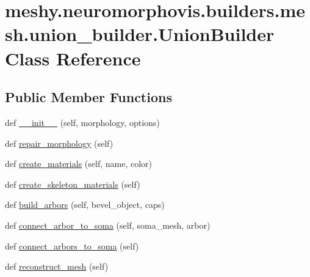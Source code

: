 \hypertarget{classmeshy_1_1neuromorphovis_1_1builders_1_1mesh_1_1union__builder_1_1UnionBuilder}{}\section{meshy.\+neuromorphovis.\+builders.\+mesh.\+union\+\_\+builder.\+Union\+Builder Class Reference}
\label{classmeshy_1_1neuromorphovis_1_1builders_1_1mesh_1_1union__builder_1_1UnionBuilder}


 


\subsection*{Public Member Functions}
\begin{DoxyCompactItemize}
\item 
def \hyperlink{classmeshy_1_1neuromorphovis_1_1builders_1_1mesh_1_1union__builder_1_1UnionBuilder_a22da4ad53478e64dbb9b02be4cb592ed}{\+\_\+\+\_\+init\+\_\+\+\_\+} (self, morphology, options)
\item 
def \hyperlink{classmeshy_1_1neuromorphovis_1_1builders_1_1mesh_1_1union__builder_1_1UnionBuilder_a784296cc3ce718f02421ac2dc4aac6ed}{repair\+\_\+morphology} (self)
\item 
def \hyperlink{classmeshy_1_1neuromorphovis_1_1builders_1_1mesh_1_1union__builder_1_1UnionBuilder_a30f68c2d069574e71f048651015414da}{create\+\_\+materials} (self, name, color)
\item 
def \hyperlink{classmeshy_1_1neuromorphovis_1_1builders_1_1mesh_1_1union__builder_1_1UnionBuilder_ac76a84cb9e5c2160bb40718d98e068cb}{create\+\_\+skeleton\+\_\+materials} (self)
\item 
def \hyperlink{classmeshy_1_1neuromorphovis_1_1builders_1_1mesh_1_1union__builder_1_1UnionBuilder_a2cedb63d49efd9ab91191865bd9b9c2f}{build\+\_\+arbors} (self, bevel\+\_\+object, caps)
\item 
def \hyperlink{classmeshy_1_1neuromorphovis_1_1builders_1_1mesh_1_1union__builder_1_1UnionBuilder_a52dc9435cf1078effd20dacb9f5b4b69}{connect\+\_\+arbor\+\_\+to\+\_\+soma} (self, soma\+\_\+mesh, arbor)\hypertarget{classmeshy_1_1neuromorphovis_1_1builders_1_1mesh_1_1union__builder_1_1UnionBuilder_a52dc9435cf1078effd20dacb9f5b4b69}{}\label{classmeshy_1_1neuromorphovis_1_1builders_1_1mesh_1_1union__builder_1_1UnionBuilder_a52dc9435cf1078effd20dacb9f5b4b69}

\item 
def \hyperlink{classmeshy_1_1neuromorphovis_1_1builders_1_1mesh_1_1union__builder_1_1UnionBuilder_a0be26ef4ea9a23e7f3b88ee277db3f39}{connect\+\_\+arbors\+\_\+to\+\_\+soma} (self)
\item 
def \hyperlink{classmeshy_1_1neuromorphovis_1_1builders_1_1mesh_1_1union__builder_1_1UnionBuilder_ac58f6d4e5660d225c408445a5698d48c}{reconstruct\+\_\+mesh} (self)
\end{DoxyCompactItemize}

